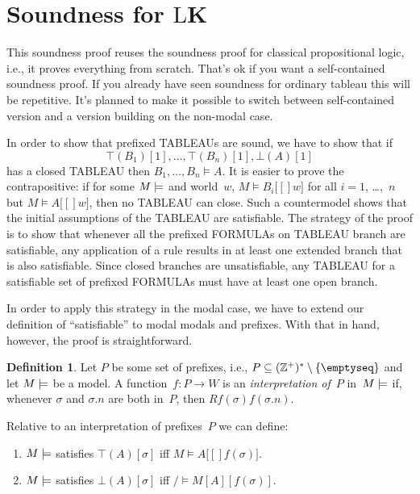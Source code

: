 \documentclass[10pt,a4paper]{article}
\newcommand*{\olup}[1]{\MakeUppercase{#1}}
\theoremstyle{plain}
\theoremstyle{definition}
\newtheorem{defn}[thm]{Definition}
\theoremstyle{remark}
\newenvironment{explain}{}{}
\newenvironment{editorial}{}{}
\newcommand*{\olfileid}[3]{}
\newcommand*{\olsection}[1]{\section*{#1}}
\providecommand{\Entails}{\mathrel{\models}}
\providecommand{\sFmla}[2]{#1(#2)}
\providecommand{\True}{\top}
\providecommand{\False}{\bot}
\providecommand{\mSat}[3]{\ensuremath{#1 \models #2[#3]}}
\providecommand{\mModel}[2]{\ensuremath{#1 \models #2}}
\providecommand{\Log}{\ensuremath{\mathrm{L}}}
\providecommand{\PosInt}{\mathbb{Z}^{+}}
\begin{document}



\olfileid{nml}{tab}{sou}

\olsection{Soundness for \Log{K}}

\begin{editorial}
  This soundness proof reuses the soundness proof for classical
  propositional logic, i.e., it proves everything from scratch. That's
  ok if you want a self-contained soundness proof. If you already have
  seen soundness for ordinary tableau this will be repetitive. It's
  planned to make it possible to switch between self-contained version
  and a version building on the non-modal case.
\end{editorial}

\begin{explain}
  In order to show that prefixed \olup{tableau}s are sound, we have to
  show that if
  \[
  \sFmla{\True}{B_1}[1], \dots, \sFmla{\True}{B_n}[1], \sFmla{\False}{A}[1]
  \]
  has a closed \olup{tableau} then $B_1, \dots, B_n \Entails A$. It is
  easier to prove the contrapositive: if for some $\mModel{M}$ and
  world~$w$, $\mSat{M}{B_i}[w]$ for all $i=1$, \dots,~$n$ but
  $\mSat{M}{A}[w]$, then no \olup{tableau} can close. Such a
  countermodel shows that the initial assumptions of the \olup{tableau}
  are satisfiable. The strategy of the proof is to show that whenever
  all the prefixed \olup{formula}s on \olup{tableau} branch are
  satisfiable, any application of a rule results in at least one
  extended branch that is also satisfiable. Since closed branches are
  unsatisfiable, any \olup{tableau} for a satisfiable set of prefixed
  \olup{formula}s must have at least one open branch.

  In order to apply this strategy in the modal case, we have to extend
  our definition of ``satisfiable'' to modal modals and prefixes. With
  that in hand, however, the proof is straightforward.
\end{explain}

\begin{defn}
  Let $P$ be some set of prefixes, i.e., $P \subseteq (\PosInt)^*
  \setminus \{\emptyseq\}$ and let $\mModel{M}$ be a model.  A
  function~$f\colon P \to W$ is an \emph{interpretation of}~$P$
  in~$\mModel{M}$ if, whenever $\sigma$ and $\sigma.n$ are both
  in~$P$, then $Rf(\sigma)f(\sigma.n)$.

  Relative to an interpretation of prefixes~$P$ we can define:
  \begin{enumerate}
  \item $\mModel{M}$ satisfies $\sFmla{\True}{A}[\sigma]$ iff
    $\mSat{M}{A}[f(\sigma)]$.
  \item $\mModel{M}$ satisfies $\sFmla{\False}{A}[\sigma]$ iff
    $\mSat/{M}{A}[f(\sigma)]$.
  \end{enumerate}
\end{defn}
\end{document}
